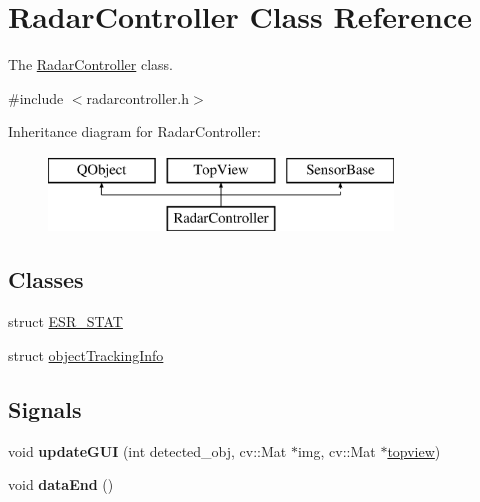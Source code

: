 \hypertarget{class_radar_controller}{}\section{Radar\+Controller Class Reference}
\label{class_radar_controller}


The \hyperlink{class_radar_controller}{Radar\+Controller} class.  




{\ttfamily \#include $<$radarcontroller.\+h$>$}

Inheritance diagram for Radar\+Controller\+:\begin{figure}[H]
\begin{center}
\leavevmode
\includegraphics[height=2.000000cm]{class_radar_controller}
\end{center}
\end{figure}
\subsection*{Classes}
\begin{DoxyCompactItemize}
\item 
struct \hyperlink{struct_radar_controller_1_1_e_s_r___s_t_a_t}{E\+S\+R\+\_\+\+S\+T\+A\+T}
\item 
struct \hyperlink{struct_radar_controller_1_1object_tracking_info}{object\+Tracking\+Info}
\end{DoxyCompactItemize}
\subsection*{Signals}
\begin{DoxyCompactItemize}
\item 
\hypertarget{class_radar_controller_af732d231a09db2453b425d49fc4ff80e}{}void {\bfseries update\+G\+U\+I} (int detected\+\_\+obj, cv\+::\+Mat $\ast$img, cv\+::\+Mat $\ast$\hyperlink{class_top_view_a693454cfb21851b389634e28bdabe35a}{topview})\label{class_radar_controller_af732d231a09db2453b425d49fc4ff80e}

\item 
\hypertarget{class_radar_controller_a9fd04ef43fb1300abcb125fc02a44779}{}void {\bfseries data\+End} ()\label{class_radar_controller_a9fd04ef43fb1300abcb125fc02a44779}

\end{DoxyCompactItemize}
